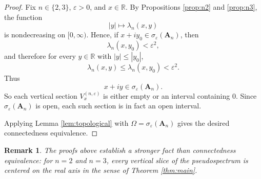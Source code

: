 \documentclass[11pt]{article}
\newtheorem{remark}[theorem]{Remark}
\newcommand{\R}{\mathbb{R}}
\newcommand{\eps}{\varepsilon}
\begin{document}
\begin{proof}
Fix \(n\in\{2,3\}\), \(\eps>0\), and \(x\in\R\). By Propositions \ref{prop:n2} and
\ref{prop:n3}, the function
\[
|y|\longmapsto \lambda_n(x,y)
\]
is nondecreasing on \([0,\infty)\). Hence, if \(x+iy_0\in \sigma_\eps(\mathbf A_n)\), then
\[
\lambda_n(x,y_0)<\eps^2,
\]
and therefore for every \(y\in\R\) with \(|y|\le |y_0|\),
\[
\lambda_n(x,y)\le \lambda_n(x,y_0)<\eps^2.
\]
Thus
\[
x+iy\in \sigma_\eps(\mathbf A_n).
\]
So each vertical section \(V_x^{(n,\eps)}\) is either empty or an interval containing \(0\).
Since \(\sigma_\eps(\mathbf A_n)\) is open, each such section is in fact an open interval.

Applying Lemma \ref{lem:topological} with \(\Omega=\sigma_\eps(\mathbf A_n)\) gives the desired
connectedness equivalence.
\end{proof}

\begin{remark}
The proofs above establish a stronger fact than connectedness equivalence: for \(n=2\) and
\(n=3\), every vertical slice of the pseudospectrum is centered on the real axis in the sense of
Theorem \ref{thm:main}.
\end{remark}
\end{document}
